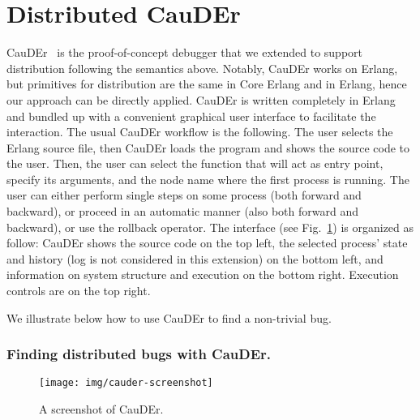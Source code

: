 \documentclass[runningheads]{llncs}
\begin{document}


\section{Distributed CauDEr}\label{sec:dist-cauder}

CauDEr~\cite{LNPV18,Gonzalez-AbrilV21,Cauder} is the proof-of-concept
debugger that we extended to support distribution following the
semantics above. Notably, CauDEr works on Erlang, but primitives for
distribution are the same in Core Erlang and in Erlang, hence our
approach can be directly applied.  CauDEr is written completely in
Erlang and bundled up with a convenient graphical user interface to
facilitate the interaction. The usual CauDEr workflow is the
following. The user selects the Erlang source file, then CauDEr loads
the program and shows the source code to the user.  Then, the user can
select the function that will act as entry point, specify its
arguments, and the node name where the first process is running. 
The user can either perform single steps on some process (both forward
and backward), or proceed in an automatic manner (also both forward
and backward), or use the rollback operator.
The interface (see Fig.~\ref{fig:cauder-screenshot}) is organized as follow: CauDEr shows the source code on the top left, the selected
process' state and history (log is not considered in this extension)
on the bottom left, and information on system structure and execution
on the bottom right. Execution controls are on the top right.

We illustrate below how to use CauDEr to
find a non-trivial bug.

\subsubsection*{Finding distributed bugs with CauDEr.}

\begin{figure}[t]
  \hspace{-2.5cm}
	\texttt{[image: img/cauder-screenshot]}
	\caption{A screenshot of CauDEr.}
	\label{fig:cauder-screenshot}
\end{figure}
\end{document}
